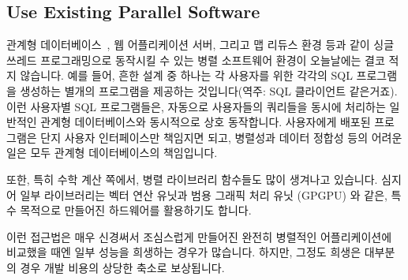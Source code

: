 \subsection{Use Existing Parallel Software}
\label{sec:intro:Use Existing Parallel Software}

관계형 데이터베이스~\cite{Date82}, 웹 어플리케이션 서버, 그리고 맵 리듀스 환경
등과 같이 싱글 쓰레드 프로그래밍으로 동작시킬 수 있는 병렬 소프트웨어 환경이
오늘날에는 결코 적지 않습니다.
예를 들어, 흔한 설계 중 하나는 각 사용자를 위한 각각의 SQL 프로그램을 생성하는
별개의 프로그램을 제공하는 것입니다(역주: SQL 클라이언트 같은거죠).
이런 사용자별 SQL 프로그램들은, 자동으로 사용자들의 쿼리들을 동시에 처리하는
일반적인 관계형 데이터베이스와 동시적으로 상호 동작합니다.
사용자에게 배포된 프로그램은 단지 사용자 인터페이스만 책임지면 되고,
병렬성과 데이터 정합성 등의 어려운 일은 모두 관계형 데이터베이스의 책임입니다.

또한, 특히 수학 계산 쪽에서, 병렬 라이브러리 함수들도 많이 생겨나고 있습니다.
심지어 일부 라이브러리는 벡터 연산 유닛과 범용 그래픽 처리 유닛 (GPGPU) 와
같은, 특수 목적으로 만들어진 하드웨어를 활용하기도 합니다.

이런 접근법은 매우 신경써서 조심스럽게 만들어진 완전히 병렬적인 어플리케이션에
비교했을 때엔 일부 성능을 희생하는 경우가 많습니다.
하지만, 그정도 희생은 대부분의 경우 개발 비용의 상당한 축소로 보상됩니다.

